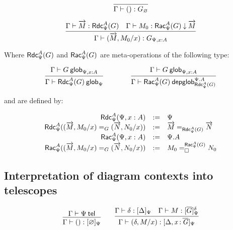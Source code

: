 \begin{small}
  \[
  \infer{\ofglob{\Gamma}{()}{G_\varnothing}}{}
  \]

  \[
  \infer{\ofglob{\Gamma}{(\tel{M},M_0/x)}{G_{\Psi,x:A}}}
  {\ofglob{\Gamma}{\tel M}{\fsttelglob{\Psi}{A}{G}}
    & \ofdepglob{\Gamma}{M_0}{\sndtelglob{\Psi}{A}{G}}{\tel M}}
  \]
\end{small}

Where $\fsttelglob{\Psi}{A}{G}$ and $\sndtelglob{\Psi}{A}{G}$ are
meta-operations of the following type:

\begin{small}
  \[
  \infer{\wfglob{\Gamma}{\fsttelglob{\Psi}{A}{G}}{\Psi}}
  {\wfglob{\Gamma}{G}{\Psi,x:A}}
  \qquad\qquad
  \infer{\wfdepglob{\Gamma}{\sndtelglob{\Psi}{A}{G}}{\Psi.A}
    {\fsttelglob{\Psi}{A}{G}}}
  {\wfglob{\Gamma}{G}{\Psi,x:A}}\]
\end{small}

and are defined by:

\begin{small}
  \[
  \begin{array}{rcl}
    \fsttelglob{\Psi}{A}{\Psi,x:A} & := & \Psi \\
    \fsttelglob{\Psi}{A}{\homj{G}{(\tel{M},M_0/x)}{(\tel{N},N_0/x)}} & := &
    \homj{\fsttelglob{\Psi}{A}{G}}{\tel{M}}{\tel{N}} \\
    \sndtelglob{\Psi}{A}{\Psi,x:A} & := & \Psi.A \\
    \sndtelglob{\Psi}{A}{\homj{G}{(\tel{M},M_0/x)}{(\tel{N},N_0/x)}} & := &
    \dhomj{\sndtelglob{\Psi}{A}{G}}{M_0}{N_0}{\blank}
    \\
  \end{array}
  \]
\end{small}

\subsection{Interpretation of diagram contexts into telescopes}

\begin{small}
\[\infer
    {\ofinterp{\Gamma}{()}{\emptyctx}{\Psi}}
    {\wftel{\Gamma}{\Psi}}
  \qquad
  \infer
    {\ofinterp{\Gamma}{(\delta,M/x)}{\Delta,\tptm{x}{\diag G}}{\Psi}}
    {\ofinterp{\Gamma}{\delta}{\Delta}{\Psi}
    &\ofglob{\Gamma}{M}{\interpglob{\diag G}{\Psi}{\delta}}}
\]
\end{small}

